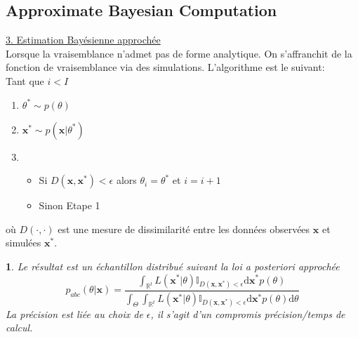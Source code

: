 \documentclass[8pt,notheorems]{beamer}
\newtheorem{remark}{\translate{Remark}}
\theoremstyle{definition}
\theoremstyle{example}
\theoremstyle{mystyle}
\theoremstyle{plain}
\begin{document}
\subsection{Approximate Bayesian Computation}
\begin{frame}[allowframebreaks]
\underline{3. Estimation Bayésienne approchée}\\

Lorsque la vraisemblance n'admet pas de forme analytique. On s'affranchit de la fonction de vraisemblance via des simulations. L'algorithme est le suivant:\\ 

Tant que $i < I $
\begin{enumerate}
\item $\theta^\ast\sim p(\theta)$
\item $\mathbf{x}^\ast\sim p(\mathbf{x}|\theta^\ast)$
\item
\begin{itemize} 
    \item Si $D(\mathbf{x}, \mathbf{x}^\ast) <\epsilon$ alors $\theta_i =\theta^\ast$ et $i = i+1$
    \item Sinon Etape 1
\end{itemize}
\end{enumerate}
où $D(\cdot,\cdot)$ est une mesure de dissimilarité entre les données observées $\mathbf{x}$ et simulées $\mathbf{x}^\ast$. 
\begin{remark}
Le résultat est un échantillon distribué suivant la loi a posteriori approchée
$$
p_{abc}(\theta|\mathbf{x})=\frac{ \int_{\mathbb{R}^t}L(\mathbf{x}^\ast|\theta)\mathbb{I}_{D(\mathbf{x}, \mathbf{x^\ast}) <\epsilon}\text{d}\mathbf{x}^\ast p(\theta)}{\int_{\Theta}\int_{\mathbb{R}^t}L(\mathbf{x}^\ast|\theta)\mathbb{I}_{D(\mathbf{x}, \mathbf{x^\ast}) <\epsilon}\text{d}\mathbf{x}^\ast p(\theta)\text{d}\theta}
$$
La précision est liée au choix de $\epsilon$, il s'agit d'un compromis précision/temps de calcul.
\end{remark}


\end{frame}
\end{document}
